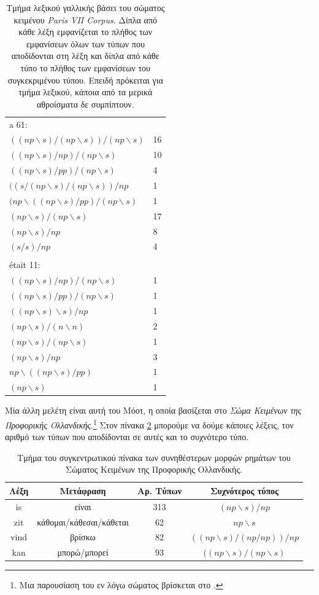 \documentclass [a4paper,11pt] {book}
\theoremstyle{definition}
\theoremstyle{definition}
\begin{document}
\begin{table}
\begin{tabular}{ll}
a 61: \\
$((np\backslash s) /(np\backslash s) )/(np\backslash s) $ & 16 \\
$((np\backslash s) /np)/(np\backslash s) $ & 10 \\
$((np\backslash s) /pp)/(np\backslash s) $ & 4 \\
$((s/(np\backslash s) /(np\backslash s) )/np$ & 1 \\
$(np\backslash ((np\backslash s) /pp)/(np\backslash s) $ & 1 \\
$(np\backslash s) /(np\backslash s) $ & 17 \\
$(np\backslash s) /np$ & 8 \\
$(s/s)/np$ & 4
\\
\\
était 11: \\
$( (np\backslash s)/np )/(np\backslash s)$ & 1 \\
$( (np\backslash s)/pp) /(np\backslash s)$ & 1 \\
$( (np\backslash s)\backslash s)/np$ & 1 \\
$(np\backslash s)/(n\backslash n)$ & 2 \\
$(np\backslash s)/(np\backslash s)$ & 1 \\
$(np\backslash s)/np$ & 3 \\
$np\backslash ((np\backslash s)/pp)$ & 1 \\
$(np\backslash s)$ & 1
\end{tabular}
\caption{Τμήμα λεξικού γαλλικής βάσει του σώματος κειμένου \textit{Paris VII Corpus}. Δίπλα από κάθε λέξη εμφανίζεται το πλήθος των εμφανίσεων όλων των τύπων που αποδίδονται στη λέξη και δίπλα από κάθε τύπο το πλήθος των εμφανίσεων του συγκεκριμένου τύπου. Επειδή πρόκειται για τμήμα λεξικού, κάποια από τα μερικά αθροίσματα δε συμπίπτουν.}
\label{frenchCorpus}
\end{table}

Μία άλλη μελέτη είναι αυτή του Μόοτ, η οποία βασίζεται στο \textit{Σώμα Κειμένων της Προφορικής Ολλανδικής}.\footnote{Μια παρουσίαση του εν λόγω σώματος βρίσκεται στο \citep{Oostdijk99buildinga}.} Στον πίνακα \ref{dutchCorpus} μπορούμε να δούμε κάποιες λέξεις, τον αριθμό των τύπων που αποδίδονται σε αυτές και το συχνότερο τύπο.
\begin{table}
\centering
\begin{tabular}{c|c|c|c}
Λέξη & Μετάφραση & Αρ. Τύπων & Συχνότερος τύπος \\ \hline
is & είναι & 313 & $(np\backslash s )/np$ \\
zit & κάθομαι/κάθεσαι/κάθεται & 62 & $np\backslash s$ \\
vind & βρίσκω & 82 & $((np\backslash s)/(np/np))/np$ \\
kan & μπορώ/μπορεί & 93 & $((np\backslash s)/(np\backslash s)$
\end{tabular}
\caption{Τμήμα του συγκεντρωτικού πίνακα των συνηθέστερων μορφών ρημάτων του Σώματος Κειμένων της Προφορικής Ολλανδικής.}
\label{dutchCorpus}
\end{table}
\end{document}
